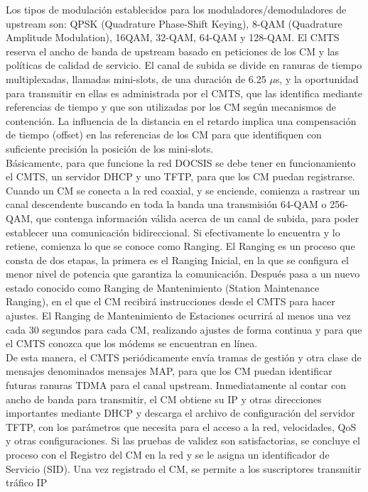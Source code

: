 Los tipos de modulación establecidos para los moduladores/demoduladores de upstream son: QPSK (Quadrature Phase-Shift Keying), 8-QAM (Quadrature Amplitude Modulation), 16QAM, 32-QAM, 64-QAM y 128-QAM. El CMTS reserva el ancho de banda de upstream basado en peticiones de los CM y las políticas de calidad de servicio. El canal de subida se divide en ranuras de tiempo multiplexadas, llamadas mini-slots, de una duración de 6.25 $\mu$s, y la oportunidad para transmitir en ellas es administrada por el CMTS, que las identifica mediante referencias de tiempo y que son utilizadas por los CM según mecanismos de contención. La influencia de la distancia en el retardo implica una compensación de tiempo (offset) en las referencias de los CM para que identifiquen con suficiente precisión la posición de los mini-slots.\\

Básicamente, para que funcione la red DOCSIS se debe tener en funcionamiento el CMTS, un servidor DHCP y uno TFTP, para que los CM puedan registrarse.\\

Cuando un CM se conecta a la red coaxial, y se enciende, comienza a rastrear un canal descendente buscando en toda la banda una transmisión 64-QAM o 256-QAM, que contenga información válida acerca de un canal de subida, para poder establecer una comunicación bidireccional. Si efectivamente lo encuentra y lo retiene, comienza lo que se conoce como Ranging. El Ranging es un proceso que consta de dos etapas, la primera es el Ranging Inicial, en la que se configura el menor nivel de potencia que garantiza la comunicación. Después pasa a un nuevo estado conocido como Ranging de Mantenimiento (Station Maintenance Ranging), en el que el CM recibirá instrucciones desde el CMTS para hacer ajustes. El Ranging de Mantenimiento de Estaciones ocurrirá al menos una vez cada 30 segundos para cada CM, realizando ajustes de forma continua y para que el CMTS conozca que los módems se encuentran en línea.\\

De esta manera, el CMTS periódicamente envía tramas de gestión y otra clase de mensajes denominados mensajes MAP, para que los CM puedan identificar futuras ranuras TDMA para el canal upstream. Inmediatamente al contar con ancho de banda para transmitir, el CM obtiene su IP y otras direcciones importantes mediante DHCP y descarga el archivo de configuración del servidor TFTP, con los parámetros que necesita para el acceso a la red, velocidades, QoS y otras configuraciones. Si las pruebas de validez son satisfactorias, se concluye el proceso con el Registro del CM en la red y se le asigna un identificador de Servicio (SID). Una vez registrado el CM, se permite a los suscriptores transmitir tráfico IP

